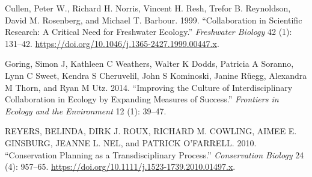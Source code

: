 \documentclass[
]{article}
\newlength{\cslhangindent}
\newlength{\cslentryspacingunit} %
\newenvironment{CSLReferences}[2] %
 {%
  \setlength{\parindent}{0pt}
  \ifodd #1
  \let\oldpar\par
  \def\par{\hangindent=\cslhangindent\oldpar}
  \fi
  \setlength{\parskip}{#2\cslentryspacingunit}
 }%
 {}
\begin{document}
\hypertarget{refs}{}
\begin{CSLReferences}{1}{0}
\leavevmode{}%
Cullen, Peter W., Richard H. Norris, Vincent H. Resh, Trefor B.
Reynoldson, David M. Rosenberg, and Michael T. Barbour. 1999.
{``Collaboration in Scientific Research: A Critical Need for Freshwater
Ecology.''} \emph{Freshwater Biology} 42 (1): 131--42.
\url{https://doi.org/10.1046/j.1365-2427.1999.00447.x}.

\leavevmode{}%
Goring, Simon J, Kathleen C Weathers, Walter K Dodds, Patricia A
Soranno, Lynn C Sweet, Kendra S Cheruvelil, John S Kominoski, Janine
Rüegg, Alexandra M Thorn, and Ryan M Utz. 2014. {``Improving the Culture
of Interdisciplinary Collaboration in Ecology by Expanding Measures of
Success.''} \emph{Frontiers in Ecology and the Environment} 12 (1):
39--47.

\leavevmode{}%
REYERS, BELINDA, DIRK J. ROUX, RICHARD M. COWLING, AIMEE E. GINSBURG,
JEANNE L. NEL, and PATRICK O'FARRELL. 2010. {``Conservation Planning as
a Transdisciplinary Process.''} \emph{Conservation Biology} 24 (4):
957--65. \url{https://doi.org/10.1111/j.1523-1739.2010.01497.x}.

\end{CSLReferences}
\end{document}
